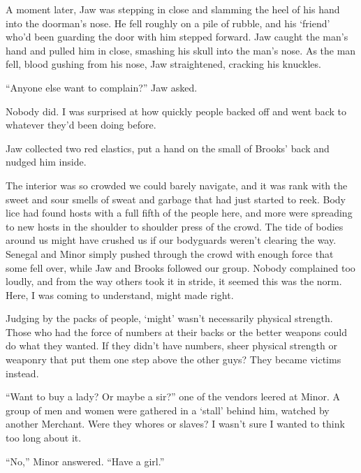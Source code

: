 A moment later, Jaw was stepping in close and slamming the heel of his hand into the doorman's nose.  He fell roughly on a pile of rubble, and his `friend' who'd been guarding the door with him stepped forward.  Jaw caught the man's hand and pulled him in close, smashing his skull into the man's nose.  As the man fell, blood gushing from his nose, Jaw straightened, cracking his knuckles.



``Anyone else want to complain?'' Jaw asked.



Nobody did. I was surprised at how quickly people backed off and went back to whatever they'd been doing before.



Jaw collected two red elastics, put a hand on the small of Brooks' back and nudged him inside.



The interior was so crowded we could barely navigate, and it was rank with the sweet and sour smells of sweat and garbage that had just started to reek.  Body lice had found hosts with a full fifth of the people here, and more were spreading to new hosts in the shoulder to shoulder press of the crowd.  The tide of bodies around us might have crushed us if our bodyguards weren't clearing the way.  Senegal and Minor simply pushed through the crowd with enough force that some fell over, while Jaw and Brooks followed our group.  Nobody complained too loudly, and from the way others took it in stride, it seemed this was the norm.  Here, I was coming to understand, might made right.



Judging by the packs of people, `might' wasn't necessarily physical strength.  Those who had the force of numbers at their backs or the better weapons could do what they wanted.   If they didn't have numbers, sheer physical strength or weaponry that put them one step above the other guys?  They became victims instead.



``Want to buy a lady?  Or maybe a sir?'' one of the vendors leered at Minor.  A group of men and women were gathered in a `stall' behind him, watched by another Merchant.  Were they whores or slaves?  I wasn't sure I wanted to think too long about it.



``No,'' Minor answered.  ``Have a girl.''



